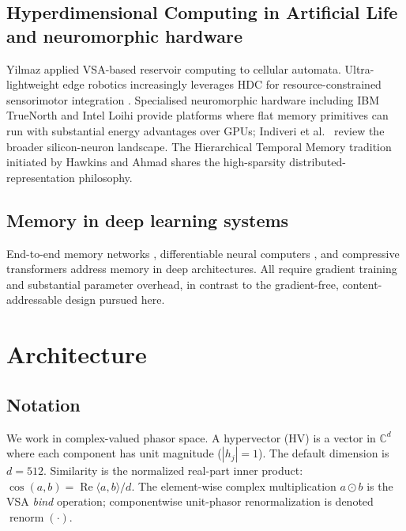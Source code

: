 \documentclass[11pt,a4paper]{article}
\begin{document}
\subsection{Hyperdimensional Computing in Artificial Life and neuromorphic hardware}
Yilmaz \cite{yilmaz2015symbolic} applied VSA-based reservoir computing
to cellular automata.  Ultra-lightweight edge robotics increasingly
leverages HDC for resource-constrained sensorimotor integration
\cite{rahimi2017hyperdimensional}.  Specialised neuromorphic hardware
including IBM TrueNorth \cite{merolla2014million} and Intel Loihi
\cite{davies2018loihi} provide platforms where flat memory primitives
can run with substantial energy advantages over GPUs;  Indiveri et al.\
\cite{indiveri2011neuromorphic} review the broader silicon-neuron
landscape.  The Hierarchical Temporal Memory tradition initiated by
Hawkins and Ahmad \cite{hawkins2016neurons} shares the high-sparsity
distributed-representation philosophy.

\subsection{Memory in deep learning systems}
End-to-end memory networks \cite{sukhbaatar2015end}, differentiable
neural computers \cite{graves2016hybrid}, and compressive transformers
\cite{rae2020compressive} address memory in deep architectures.  All
require gradient training and substantial parameter overhead, in
contrast to the gradient-free, content-addressable design pursued here.

\section{Architecture}
\label{sec:arch}

\subsection{Notation}
We work in complex-valued phasor space.  A hypervector (HV) is a vector
in $\mathbb{C}^d$ where each component has unit magnitude ($|h_j| = 1$).
The default dimension is $d = 512$.  Similarity is the normalized
real-part inner product:
$\cos(a, b) = \operatorname{Re}\langle a, b \rangle / d$.  The
element-wise complex multiplication $a \odot b$ is the VSA \emph{bind}
operation;  componentwise unit-phasor renormalization is denoted
$\operatorname{renorm}(\cdot)$.
\end{document}
